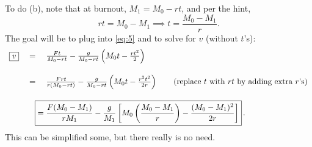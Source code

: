 \documentclass[12 pt]{article}
\begin{document}
\begin{enumerate}[leftmargin=0in, rightmargin=-0.25in]
{		To do (b), note that at burnout, $M_1=M_0-rt$, and per the hint, $$rt=M_0-M_1\implies t=\frac{M_0-M_1}{r}.$$ 
		The goal will be to plug into \eqref{eq:5} and to solve for $v$ (without $t$'s):
		$$\begin{array}{rcl}
			\boxed{v}
			& = & \frac{Ft}{M_0-rt} - \frac{g}{M_0-rt}\left(M_0t-\frac{rt^2}{2}\right) \\[6mm]
			& = &\frac{Frt}{r(M_0-rt)}-\frac{g}{M_0-rt}\left(M_0t-\frac{r^2t^2}{2r} \right)\quad\quad\text{(replace $t$ with $rt$ by adding extra $r$'s)}\\[6mm]
			& \Aboxed{= & \frac{F(M_0-M_1)}{rM_1}-\frac{g}{M_1}\left[M_0\left(\frac{M_0-M_1}{r}\right)-\frac{(M_0-M_1)^2}{2r}\right]}\,.
		\end{array}
		$$
		This can be simplified some, but there really is no need.
	}
	
	
\end{enumerate}
\end{document}
